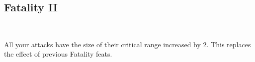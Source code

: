 \subsection*{Fatality II}\label{feat:fatality2}
 \\

All your attacks have the size of their critical range increased by 2. This
replaces the effect of previous Fatality feats.
